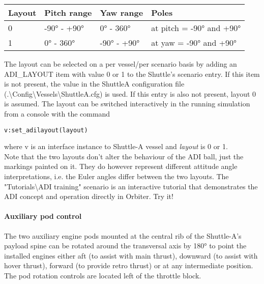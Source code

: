 \documentclass[Orbiter User Manual.tex]{subfiles}
\begin{document}
	\begin{longtable}{ |p{}|p{}|p{}|p{}| }
	\hline\rule{0pt}{2ex}
	\textbf{Layout} & \textbf{Pitch range} & \textbf{Yaw range} & \textbf{Poles}\\
	\hline\rule{0pt}{2ex}
	0 & -90° - +90° & 0° - 360° & at pitch = -90° and +90°\\
	\hline\rule{0pt}{2ex}
	1 & 0° - 360° & -90° - +90° & at yaw = -90° and +90°\\
	\hline
	\end{longtable}

\noindent
The layout can be selected on a per vessel/per scenario basis by adding an ADI\_LAYOUT item with value 0 or 1 to the Shuttle's scenario entry. If this item is not present, the value in the ShuttleA configuration file (.\textbackslash Config\textbackslash Vessels\textbackslash ShuttleA.cfg) is used. If this entry is also not present, layout 0 is assumed. The layout can be switched interactively in the running simulation from a console with the command

\begin{lstlisting}[language=OSFS]
v:set_adilayout(layout)
\end{lstlisting}

\noindent
where v is an interface instance to Shuttle-A vessel and \textit{layout} is 0 or 1.\\
Note that the two layouts don't alter the behaviour of the ADI ball, just the markings painted on it. They do however represent different attitude angle interpretations, i.e. the Euler angles differ between the two layouts.
The "Tutorials\textbackslash ADI training" scenario is an interactive tutorial that demonstrates the ADI concept and operation directly in Orbiter. Try it!


\paragraph{Auxiliary pod control}
The two auxiliary engine pods mounted at the central rib of the Shuttle-A's payload spine can be rotated  around the transversal axis by 180° to point the installed engines either aft (to assist with main thrust), downward (to assist with hover thrust), forward (to provide retro thrust) or at any intermediate position. The pod rotation controls are located left of the throttle block.
\end{document}
